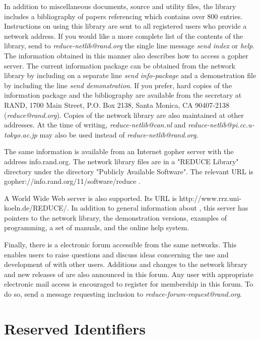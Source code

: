 In addition to miscellaneous documents, source and utility files, the
library includes a bibliography of papers referencing {\REDUCE} which
contains over 800 entries.  Instructions on using this library are sent to
all registered {\REDUCE} users who provide a network address.  If you
would like a more complete list of the contents of the library, send to
{\em reduce-netlib@rand.org\/} the single line message {\em send index\/} or
{\em help}.  The information obtained in this manner also describes how to
access a {\REDUCE} gopher server.  The current {\REDUCE} information
package can be obtained from the network library by including on a
separate line {\em send info-package\/} and a demonstration file by
including the line {\em send demonstration}.  If you prefer, hard copies
of the information package and the bibliography are available from the
{\REDUCE} secretary at RAND, 1700 Main Street, P.O.  Box 2138, Santa
Monica, CA 90407-2138 ({\em reduce@rand.org}).  Copies of the network
library are also maintained at other addresses.  At the time of writing,
{\em reduce-netlib@can.nl\/} and {\em reduce-netlib@pi.cc.u-tokyo.ac.jp\/}
may also be used instead of {\em reduce-netlib@rand.org}.

The same information is available from an Internet gopher server with
the address info.rand.org.  The network library files are in a "REDUCE
Library" directory under the directory "Publicly Available Software".
The relevant URL is gopher://info.rand.org/11/software/reduce .

A World Wide Web {\REDUCE} server is also supported.  Its URL is
http://www.rrz.uni-koeln.de/REDUCE/.  In addition to general information
about {\REDUCE}, this server has pointers to the network library, the
demonstration versions, examples of {\REDUCE} programming, a set of
manuals, and the {\REDUCE} online help system.

Finally, there is a {\REDUCE} electronic forum accessible from the same
networks.  This enables {\REDUCE} users to raise questions and discuss
ideas concerning the use and development of {\REDUCE} with other users.
Additions and changes to the network library and new releases of {\REDUCE}
are also announced in this forum.  Any user with appropriate electronic
mail access is encouraged to register for membership in this forum.  To do
so, send a message requesting inclusion to
{\em reduce-forum-request@rand.org}.

\appendix
\chapter{Reserved Identifiers}

